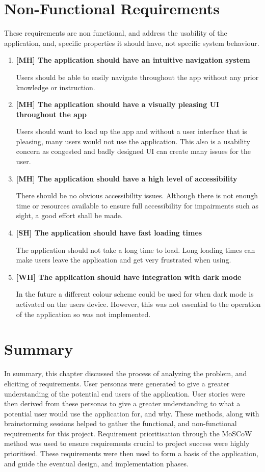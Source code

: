 \section{Non-Functional Requirements} \label{non-functional}
These requirements are non functional, and address the usability of the application, and, specific properties it should have, not specific system behaviour. 
\begin{enumerate}
    \item \textbf{[MH] The application should have an intuitive navigation system }\par
    Users should be able to easily navigate throughout the app without any prior knowledge or instruction.
    \item \textbf{[MH] The application should have a visually pleasing UI throughout the app }\par
    Users should want to load up the app and without a user interface that is pleasing, many users would not use the application. This also is a usability concern as congested and badly designed UI can create many issues for the user.
    \item \textbf{[MH] The application should have a high level of accessibility }\par
    There should be no obvious accessibility issues. Although there is not enough time or resources available to ensure full accessibility for impairments such as sight, a good effort shall be made.
    \item \textbf{[SH] The application should have fast loading times }\par
    The application should not take a long time to load. Long loading times can make users leave the application and get very frustrated when using.
    \item \textbf{[WH] The application should have integration with dark mode }\par
    In the future a different colour scheme could be used for when dark mode is activated on the users device. However, this was not essential to the operation of the application so was not implemented. 
\end{enumerate}

\section{Summary}

In summary, this chapter discussed the process of analyzing the problem, and eliciting of requirements. User personas were generated to give a greater understanding of the potential end users of the application. User stories were then derived from these personas to give a greater understanding to what a potential user would use the application for, and why. These methods, along with brainstorming sessions helped to gather the functional, and non-functional requirements for this project. Requirement prioritisation through the MoSCoW method was used to ensure requirements crucial to project success were highly prioritised. These requirements were then used to form a basis of the application, and guide the eventual design, and implementation phases.